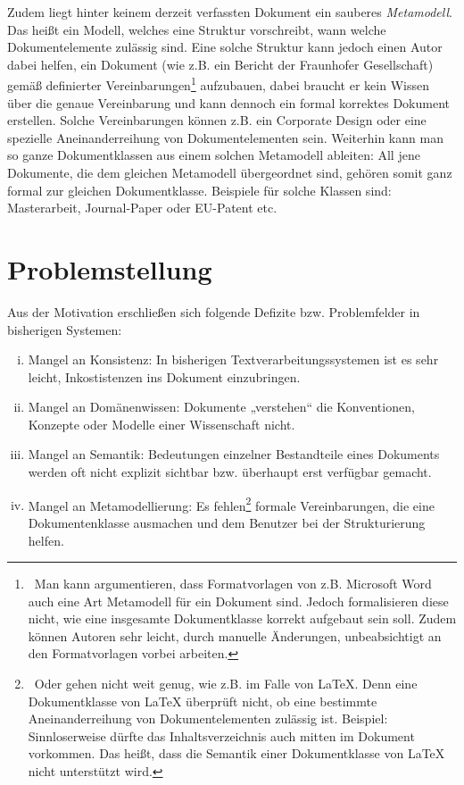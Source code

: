  
Zudem liegt hinter keinem derzeit verfassten Dokument ein sauberes \emph{Metamodell}. Das heißt ein Modell, welches eine Struktur vorschreibt, wann welche Dokumentelemente zulässig sind. Eine solche Struktur kann jedoch einen Autor dabei helfen, ein Dokument (wie z.B. ein Bericht der Fraunhofer Gesellschaft) gemäß definierter Vereinbarungen\footnote{~Man kann argumentieren, dass Formatvorlagen von z.B. Microsoft Word auch eine Art Metamodell für ein Dokument sind. Jedoch formalisieren diese nicht, wie eine insgesamte Dokumentklasse korrekt aufgebaut sein soll. Zudem können Autoren sehr leicht, durch manuelle Änderungen, unbeabsichtigt an den Formatvorlagen vorbei arbeiten.} aufzubauen, dabei braucht er kein Wissen über die genaue Vereinbarung und kann dennoch ein formal korrektes Dokument erstellen. Solche Vereinbarungen können z.B. ein Corporate Design oder eine spezielle Aneinanderreihung von Dokumentelementen sein. Weiterhin kann man so ganze Dokumentklassen aus einem solchen Metamodell ableiten: All jene Dokumente, die dem gleichen Metamodell übergeordnet sind, gehören somit ganz formal zur gleichen Dokumentklasse. Beispiele für solche Klassen sind: Masterarbeit, Journal-Paper oder EU-Patent etc.

 
\section{Problemstellung}\label{problemstellung}
 
Aus der Motivation erschließen sich folgende Defizite bzw. Problemfelder in bisherigen Systemen:

 
\begin{enumerate}[(i)]

\item
Mangel an Konsistenz: In bisherigen Textverarbeitungssystemen ist es sehr leicht, Inkostistenzen ins Dokument einzubringen.


\item
Mangel an Domänenwissen: Dokumente „verstehen“ die Konventionen, Konzepte oder Modelle einer Wissenschaft nicht.


\item
Mangel an Semantik: Bedeutungen einzelner Bestandteile eines Dokuments werden oft nicht explizit sichtbar bzw. überhaupt erst verfügbar gemacht.


\item
Mangel an Metamodellierung: Es fehlen\footnote{~Oder gehen nicht weit genug, wie z.B. im Falle von LaTeX. Denn eine Dokumentklasse von LaTeX überprüft nicht, ob eine bestimmte Aneinanderreihung von Dokumentelementen zulässig ist. Beispiel: Sinnloserweise dürfte das Inhaltsverzeichnis auch mitten im Dokument vorkommen. Das heißt, dass die Semantik einer Dokumentklasse von LaTeX nicht unterstützt wird.} formale Vereinbarungen, die eine Dokumentenklasse ausmachen und dem Benutzer bei der Strukturierung helfen.


\end{enumerate}
 
